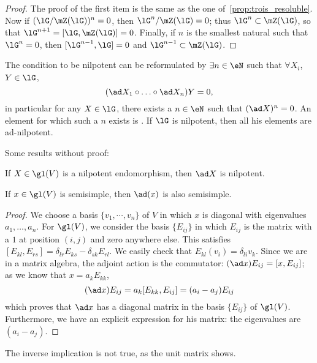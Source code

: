 \begin{proof}
	The proof of the first item is the same as the one of~\ref{prop:trois_resoluble}. Now if $(\lG/\mZ(\lG))^n=0$, then $\lG^n/\mZ(\lG)=0$; thus $\lG^n\subset\mZ(\lG)$, so that $\lG^{n+1}=[\lG,\mZ(\lG)]=0$. Finally, if $n$ is the smallest natural such that $\lG^n=0$, then $[\lG^{n-1},\lG]=0$ and $\lG^{n-1}\subset\mZ(\lG)$.
\end{proof}

The condition to be nilpotent can be reformulated by $\exists n\in\eN$ such that $\forall X_i$, $Y\in\lG$,
\[
	(\ad X_1\circ\ldots\circ\ad X_n)Y=0,
\]
in particular for any $X\in\lG$, there exists a $n\in\eN$ such that $(\ad X)^n=0$. An element for which such a $n$ exists is . If $\lG$ is nilpotent, then all his elements are ad-nilpotent.

Some results without proof:

\begin{lemma}\label{lem:pre_Engel}
	If $X\in\gl(V)$ is a nilpotent endomorphism, then $\ad X$ is nilpotent.
\end{lemma}

\begin{lemma}
	If $x\in\gl(V)$ is semisimple, then $\ad(x)$ is also semisimple.
\end{lemma}

\begin{proof}
	We choose a basis $\{v_1,\cdots,v_n\}$ of $V$ in which $x$ is diagonal with eigenvalues $a_1,\ldots,a_n$. For $\gl(V)$, we consider the basis $\{E_{ij}\}$ in which $E_{ij}$ is the matrix with a $1$ at position $(i,j)$ and zero anywhere else. This satisfies $[E_{kl},E_{rs}]=\delta_{lr}E_{ks}-\delta_{sk}E_{rl}$. We easily check that $E_{kl}(v_i)=\delta_{li}v_k$. Since we are in a matrix algebra, the adjoint action is the commutator: $(\ad x)E_{ij}=[x,E_{ij}]$; as we know that $x=a_kE_{kk}$,
	\begin{equation}
		(\ad x)E_{ij}=a_k[E_{kk},E_{ij}]=(a_i-a_j)E_{ij}
	\end{equation}
	which proves that $\ad x$ has a diagonal matrix in the basis $\{E_{ij}\}$ of $\gl(V)$. Furthermore, we have an explicit expression for his matrix: the eigenvalues are $(a_i-a_j)$.
\end{proof}

\begin{remark}
	The inverse implication is not true, as the unit matrix shows.
\end{remark}

